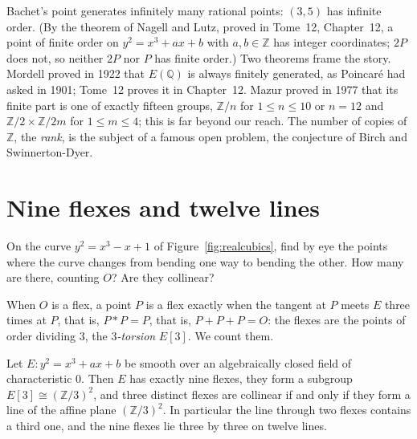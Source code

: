 \begin{remark}
Bachet's point generates infinitely many rational points: $(3,5)$ has infinite order. (By the theorem of Nagell and Lutz, proved in Tome~12, Chapter~12, a
point of finite order on $y^2=x^3+ax+b$ with $a,b\in\mathbb Z$ has integer coordinates; $2P$ does not, so neither $2P$ nor $P$ has finite order.) Two
theorems frame the story. Mordell proved in 1922 that $E(\mathbb Q)$ is always finitely generated, as Poincar\'e had asked in 1901; Tome~12 proves it in
Chapter~12. Mazur proved in 1977 that its finite part is one of exactly fifteen groups, $\mathbb Z/n$ for $1\le n\le10$ or $n=12$ and
$\mathbb Z/2\times\mathbb Z/2m$ for $1\le m\le4$; this is far beyond our reach. The number of copies of $\mathbb Z$, the \emph{rank}, is the subject of a famous open
problem, the conjecture of Birch and Swinnerton-Dyer.
\end{remark}

\section{Nine flexes and twelve lines}

\begin{think}
On the curve $y^2=x^3-x+1$ of Figure~\ref{fig:realcubics}, find by eye the points where the curve changes from bending one way to bending the other. How many
are there, counting $O$? Are they collinear?
\end{think}

When $O$ is a flex, a point $P$ is a flex exactly when the tangent at $P$ meets $E$ three times at $P$, that is, $P*P=P$, that is, $P+P+P=O$: the flexes are
the points of order dividing $3$, the \emph{$3$-torsion} $E[3]$. We count them.

\begin{theorem}\label{thm:nineflexes}
Let $E:y^2=x^3+ax+b$ be smooth over an algebraically closed field of characteristic $0$. Then $E$ has exactly nine flexes, they form a subgroup
$E[3]\cong(\mathbb Z/3)^2$, and three distinct flexes are collinear if and only if they form a line of the affine plane $(\mathbb Z/3)^2$. In particular the
line through two flexes contains a third one, and the nine flexes lie three by three on twelve lines.
\end{theorem}

